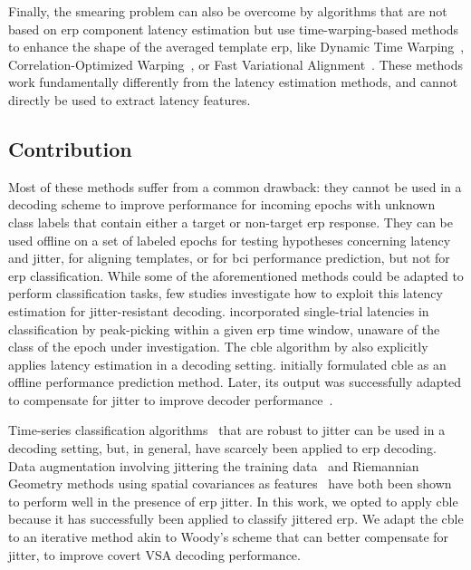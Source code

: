 Finally, the smearing problem can also be overcome by algorithms that are not
based on \ac{erp} component latency estimation but use time-warping-based methods
to enhance the shape of the averaged template \ac{erp}, like Dynamic Time
Warping~\cite{Gupta1996, Wang2001, Zoumpoulaki2015}, Correlation-Optimized
Warping~\cite{Skov2006}, or Fast Variational
Alignment~\cite{Flotho2021}.
These methods work
fundamentally differently from the latency estimation methods, and cannot
directly be used to extract latency features.

\subsection{Contribution}
\label{sec:wcble/literature/contrib}

Most of these methods suffer from a common drawback: they cannot be used in a
decoding scheme to improve performance for incoming epochs with unknown
class labels that contain either a target or non-target \ac{erp} response.
They can be used offline on a set of labeled epochs for testing hypotheses
concerning latency and jitter, for aligning templates, or for \ac{bci} performance
prediction, but not for \ac{erp} classification.
While some of the aforementioned methods could be adapted to perform
classification tasks, few studies investigate how to exploit this latency estimation
for jitter-resistant decoding.
\textcite{Hardiansyah2020} incorporated single-trial latencies in
classification by peak-picking within a given
\ac{erp} time window, unaware of the class of the epoch under investigation.
The \ac{cble} algorithm by \textcite{Thompson2012} also explicitly applies latency estimation in a
decoding setting.
\textcite{Thompson2012} initially formulated \ac{cble} as an offline performance
prediction method.
Later, its output was successfully adapted to compensate for jitter to improve
decoder performance~\cite{Mowla2017, Zisk2022}.

Time-series classification algorithms~\cite{Abanda2019}
that are robust to jitter can be used in a decoding setting,
but, in general, have scarcely been applied to \ac{erp} decoding.
Data augmentation involving jittering the training
data~\cite{Krell2018, Zisk2022} and Riemannian Geometry methods using spatial
covariances as features~\cite{Aydarkhanov2020} have both been shown
to perform well in the presence of \ac{erp} jitter.
In this work, we opted to apply \ac{cble} because it has successfully been applied to
classify jittered \acs{erp}.
We adapt the \ac{cble} to an iterative method akin to Woody's scheme that can better
compensate for jitter, to improve covert VSA decoding performance.


